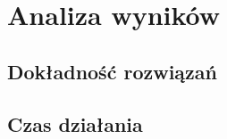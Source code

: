 \chapter{Analiza wyników}
\thispagestyle{chapterBeginStyle}
\section{Dokładność rozwiązań}
\section{Czas działania}